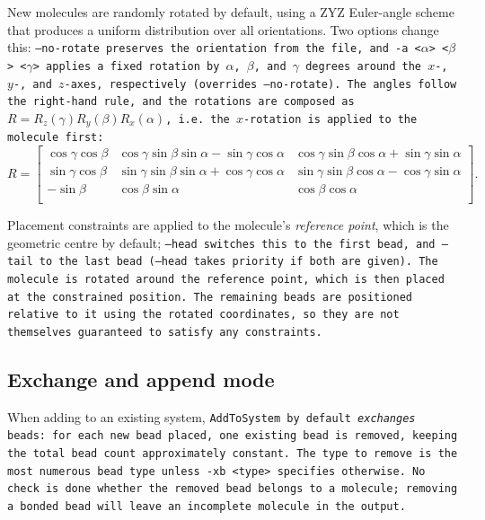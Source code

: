 New molecules are randomly rotated by default, using a ZYZ Euler-angle scheme
that produces a uniform distribution over all orientations. Two options change
this: \tt{--no-rotate} preserves the orientation from the \field file, and
\tt{-a <$\alpha$> <$\beta$> <$\gamma$>} applies a fixed rotation by $\alpha$,
$\beta$, and $\gamma$ degrees around the $x$-, $y$-, and $z$-axes,
respectively (overrides \tt{--no-rotate}). The angles follow the right-hand
rule, and the rotations are composed as $R = R_z(\gamma)R_y(\beta)R_x(\alpha)$,
i.e.\ the $x$-rotation is applied to the molecule first:
\begin{equation}
  R = \left[
  \begin{array}{ccc}
    \cos\gamma\cos\beta &
      \cos\gamma\sin\beta\sin\alpha - \sin\gamma\cos\alpha &
      \cos\gamma\sin\beta\cos\alpha + \sin\gamma\sin\alpha \\
    \sin\gamma\cos\beta &
      \sin\gamma\sin\beta\sin\alpha + \cos\gamma\cos\alpha &
      \sin\gamma\sin\beta\cos\alpha - \cos\gamma\sin\alpha \\
    -\sin\beta &
      \cos\beta\sin\alpha &
      \cos\beta\cos\alpha \\
  \end{array} \right].
\end{equation}

Placement constraints are applied to the molecule's \emph{reference point},
which is the geometric centre by default; \tt{--head} switches this to the
first bead, and \tt{--tail} to the last bead (\tt{--head} takes priority if
both are given). The molecule is rotated around the reference point, which is
then placed at the constrained position. The remaining beads are positioned
relative to it using the rotated \field coordinates, so they are not
themselves guaranteed to satisfy any constraints.

\subsection{Exchange and append mode}

When adding to an existing system, \tt{AddToSystem} by default
\emph{exchanges} beads: for each new bead placed, one existing bead is removed,
keeping the total bead count approximately constant. The type to remove is the
most numerous bead type unless \tt{-xb <type>} specifies otherwise. No check
is done whether the removed bead belongs to a molecule; removing a bonded bead
will leave an incomplete molecule in the output.

